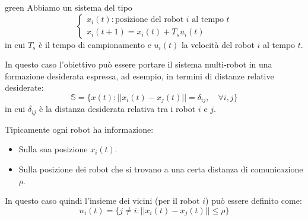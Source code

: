 \begin{mybox}[breakable]{green}{}
Abbiamo un sistema del tipo
\begin{equation}
\begin{cases}
x_i(t) : \text{posizione del robot $i$ al tempo $t$} \\
x_i(t+1) = x_i(t) + T_s u_i(t)
\end{cases}
\end{equation}
in cui $T_s$ \`e il tempo di campionamento e $u_i(t)$ la velocit\`a del robot $i$ al tempo $t$.

In questo caso l'obiettivo pu\`o essere portare il sistema multi-robot in una formazione desiderata espressa, ad esempio, in termini di distanze relative desiderate:
\begin{equation}
\mathbb{S} = \{ x(t): ||x_i(t) - x_j(t)|| = \delta_{ij}, \quad \forall i,j \}
\end{equation}
in cui $\delta_{ij}$ \`e la distanza desiderata relativa tra i robot $i$ e $j$.
\begin{center}
\end{center}
Tipicamente ogni robot ha informazione:
\begin{itemize}
    \item Sulla sua posizione $x_i(t)$.
    \item Sulla posizione dei robot che si trovano a una certa distanza di comunicazione $\rho$.
\end{itemize}
In questo caso quindi l'insieme dei vicini (per il robot $i$) pu\`o essere definito come:
\begin{equation}
    n_i(t) = \{ j \neq i: ||x_i(t) - x_j(t)|| \leq \rho \}
\end{equation}
\end{mybox}

